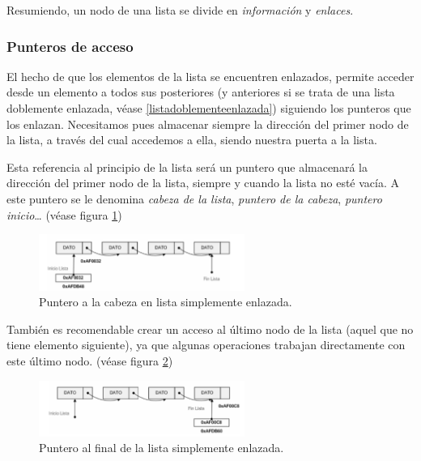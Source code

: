 \documentclass[a4paper, 11pt, titlepage]{article}
\begin{document}
            Resumiendo, un nodo de una lista se divide en \textit{información} y \textit{enlaces}.

        \subsubsection{Punteros de acceso}

            El hecho de que los elementos de la lista se encuentren enlazados, permite acceder
            desde un elemento a todos sus posteriores (y anteriores si se trata de una lista 
            doblemente enlazada, véase \ref{listadoblementeenlazada}) siguiendo los punteros que 
            los enlazan. Necesitamos pues almacenar siempre la dirección del primer nodo de la 
            lista, a través del cual accedemos a ella, siendo nuestra puerta a la lista.

            Esta referencia al principio de la lista será un puntero que almacenará la dirección 
            del primer nodo de la lista, siempre y cuando la lista no esté vacía. A este puntero se 
            le denomina \textit{cabeza de la lista}, \textit{puntero de la cabeza}, \textit{puntero inicio}\dots
            (véase figura \ref{listaenlazada03})

            \begin{figure}[htp]
                \centering
                \includegraphics[width=0.6\textwidth]{resources/listaenlazada03.png}
                \caption{Puntero a la cabeza en lista simplemente enlazada.}
                \label{listaenlazada03}
            \end{figure}

            También es recomendable crear un acceso al último nodo de la lista (aquel que no tiene elemento 
            siguiente), ya que algunas operaciones trabajan directamente con este último nodo.
            (véase figura \ref{listaenlazada04})

            \begin{figure}[htp]
                \centering
                \includegraphics[width=0.6\textwidth]{resources/listaenlazada04.png}
                \caption{Puntero al final de la lista simplemente enlazada.}
                \label{listaenlazada04}
            \end{figure}
                
\end{document}
